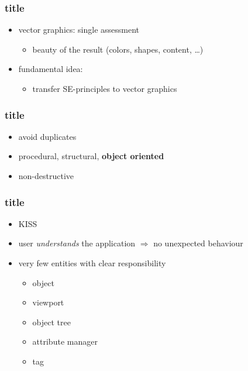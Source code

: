 \documentclass{beamer}
\begin{document}
\begin{frame}[t]\frametitle{title}
\begin{itemize}
  \item vector graphics: single assessment
  \begin{itemize}
    \item beauty of the result (colors, shapes, content, \dots)
  \end{itemize}
  \item fundamental idea:
  \begin{itemize}
    \item transfer SE-principles to vector graphics
  \end{itemize}
\end{itemize}
\end{frame}

\begin{frame}[t]\frametitle{title}
\begin{itemize}
  \item avoid duplicates
  \item procedural, structural, \textbf{object oriented}
  \item non-destructive
\end{itemize}
\end{frame}

\begin{frame}[t]\frametitle{title}
\begin{itemize}
  \item KISS
  \item user \emph{understands} the application $\Rightarrow$ no unexpected behaviour

  \item very few entities with clear responsibility
  \begin{itemize}
    \item object
    \item viewport
    \item object tree
    \item attribute manager
    \item tag
  \end{itemize}
\end{itemize}
\end{frame}
\end{document}
